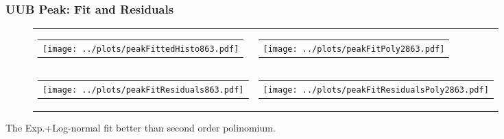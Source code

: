 \documentclass[aspectratio=169]{beamer}
\begin{document}
\begin{frame}
  \frametitle{UUB Peak: Fit and Residuals}
  \begin{figure}
    \centering
    \begin{tabularx}{\textwidth}{CC}
      \begin{tabular}{l}
        \texttt{[image: ../plots/peakFittedHisto863.pdf]}
      \end{tabular}
      &
      \begin{tabular}{l}
        \texttt{[image: ../plots/peakFitPoly2863.pdf]}
      \end{tabular}
      \\
      \begin{tabular}{l}
        \texttt{[image: ../plots/peakFitResiduals863.pdf]}
      \end{tabular}
      &
      \begin{tabular}{l}
        \texttt{[image: ../plots/peakFitResidualsPoly2863.pdf]}
      \end{tabular}
    \end{tabularx}
  \end{figure}
  The Exp.+Log-normal fit better than second order polinomium.
\end{frame}


\end{document}
